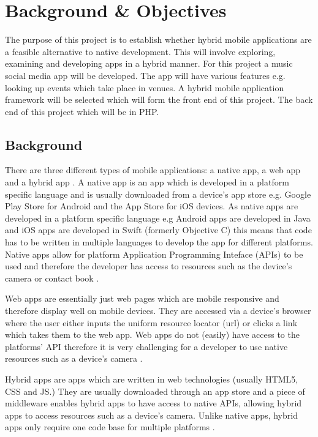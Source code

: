 \chapter{Background \& Objectives}

The purpose of this project is to establish whether hybrid mobile applications are a feasible alternative to native development. This will involve exploring, examining and developing apps in a hybrid manner. For this project a music social media app will be developed. The app will have various features e.g. looking up events which take place in  venues. A hybrid mobile application framework will be selected which will form the front end of this project. The back end of this project which will be in PHP.

\section{Background}
There are three different types of mobile applications: a native app, a web app and a hybrid app \cite{BAB} \cite{IIA} \cite{PTA}. A native app is an app which is developed in a platform specific language and is usually downloaded from a device's app store e.g. Google Play Store for Android and the App Store for iOS devices. As  native apps are developed in a platform specific language e.g Android apps are developed in Java \cite{AD} and iOS apps are developed in Swift (formerly Objective C) \cite{ID} this means that  code has to be written in multiple languages to develop the app for different platforms. Native apps allow for platform Application Programming Inteface (APIs) to be used and therefore the developer has access to resources such as the device's camera or contact book \cite{MAC} \cite{MF}.

Web apps are essentially just web pages which are mobile responsive and therefore display well on mobile devices. They are accessed via a device's browser where the user either inputs the uniform resource locator (url) or clicks a link which takes them to the web app. Web apps do not (easily) have access to the platforms' API therefore it is very challenging for a developer to use native resources such as a device's camera \cite{MAC} \cite{BAB} .

Hybrid apps are apps which are written in web technologies (usually HTML5, CSS and JS.) They are usually downloaded through an app store and a piece of middleware enables hybrid apps to have access to native APIs, allowing hybrid apps to access resources such as a device's camera. Unlike native apps, hybrid apps only require one code base for multiple platforms\cite{MAC} \cite{SF}.

